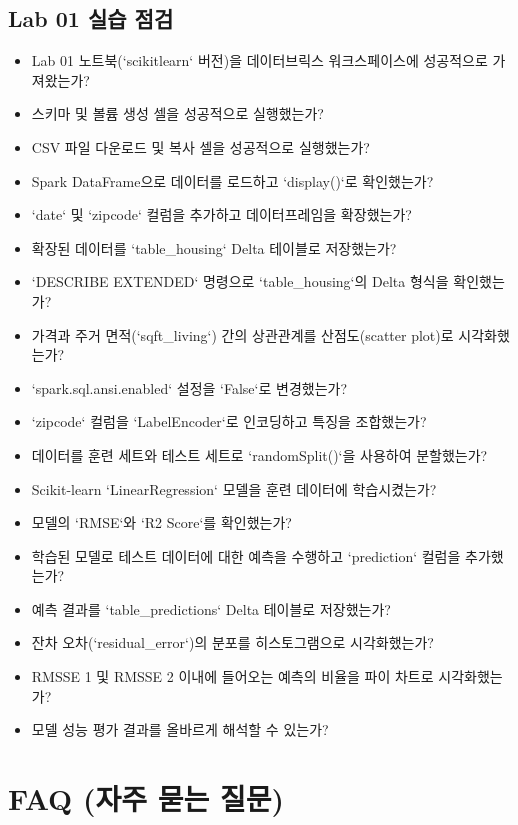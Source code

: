 \documentclass[11pt,a4paper]{article}
\begin{document}
\subsection{Lab 01 실습 점검}
\begin{itemize}
    \item [ ] Lab 01 노트북(`scikitlearn` 버전)을 데이터브릭스 워크스페이스에 성공적으로 가져왔는가?
    \item [ ] 스키마 및 볼륨 생성 셀을 성공적으로 실행했는가?
    \item [ ] CSV 파일 다운로드 및 복사 셀을 성공적으로 실행했는가?
    \item [ ] Spark DataFrame으로 데이터를 로드하고 `display()`로 확인했는가?
    \item [ ] `date` 및 `zipcode` 컬럼을 추가하고 데이터프레임을 확장했는가?
    \item [ ] 확장된 데이터를 `table_housing` Delta 테이블로 저장했는가?
    \item [ ] `DESCRIBE EXTENDED` 명령으로 `table_housing`의 Delta 형식을 확인했는가?
    \item [ ] 가격과 주거 면적(`sqft_living`) 간의 상관관계를 산점도(scatter plot)로 시각화했는가?
    \item [ ] `spark.sql.ansi.enabled` 설정을 `False`로 변경했는가?
    \item [ ] `zipcode` 컬럼을 `LabelEncoder`로 인코딩하고 특징을 조합했는가?
    \item [ ] 데이터를 훈련 세트와 테스트 세트로 `randomSplit()`을 사용하여 분할했는가?
    \item [ ] Scikit-learn `LinearRegression` 모델을 훈련 데이터에 학습시켰는가?
    \item [ ] 모델의 `RMSE`와 `R2 Score`를 확인했는가?
    \item [ ] 학습된 모델로 테스트 데이터에 대한 예측을 수행하고 `prediction` 컬럼을 추가했는가?
    \item [ ] 예측 결과를 `table_predictions` Delta 테이블로 저장했는가?
    \item [ ] 잔차 오차(`residual_error`)의 분포를 히스토그램으로 시각화했는가?
    \item [ ] RMSSE 1 및 RMSSE 2 이내에 들어오는 예측의 비율을 파이 차트로 시각화했는가?
    \item [ ] 모델 성능 평가 결과를 올바르게 해석할 수 있는가?
\end{itemize}

\newpage
\section{FAQ (자주 묻는 질문)}
\end{document}
